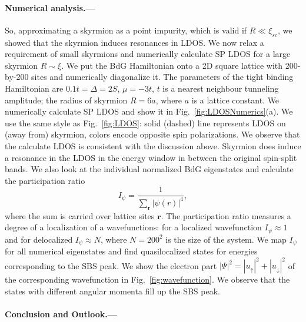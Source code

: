 \documentclass[twocolumn,showpacs,floatfix,longbibliography]{revtex4-1}
\begin{document}
\paragraph*{Numerical analysis.---} \label{sec:numerics} 
So, approximating a skyrmion as a point impurity, which is valid if $R\ll\xi_{sc}$, we showed that the skyrmion induces resonances in LDOS. We now relax a requirement of small skyrmions and numerically calculate SP LDOS for a large skyrmion $R\sim \xi$. We put the BdG Hamiltonian onto a 2D square lattice with 200-by-200 sites and numerically diagonalize it. The parameters of the tight binding Hamiltonian are $0.1t=\Delta=2S$, $\mu = -3t$, $t$ is a nearest neighbour tunneling amplitude; the radius of skyrmion $R = 6a$, where $a$ is a lattice constant. We numerically calculate SP LDOS and show it in Fig.~\ref{fig:LDOSNumerics}(a). We use the same style as Fig.~\ref{fig:LDOS}: solid (dashed) line represents LDOS on (away from) skyrmion, colors encode opposite spin polarizations. We observe that the calculate LDOS is consistent with the discussion above. Skyrmion does induce a resonance in the LDOS in the energy window in between the original spin-split bands. We also look at the individual normalized BdG eigenstates and calculate the participation ratio
\begin{equation}
	I_\psi =\frac{1}{\sum_{\bm r} |\psi(r)|^4},
	\label{I}
\end{equation}
where the sum is carried over lattice sites $\bm r$. The participation ratio measures a degree of a localization of a wavefunctions: for a localized wavefunction $I_\psi \approx 1$ and for delocalized $I_\psi \approx N$, where $N = 200^2$ is the size of the system. We map $I_\psi$ for all numerical eigenstates and find quasilocalized states for energies corresponding to the SBS peak. We show the electron part  $|\Psi|^2 = |u_{\uparrow}|^2+|u_{\downarrow}|^2$ of the corresponding wavefunction in Fig.~\ref{fig:wavefunction}. We observe that the states with different angular momenta fill up the SBS peak. 




\paragraph*{Conclusion and Outlook.---} \label{sec:conclusion}
\end{document}
